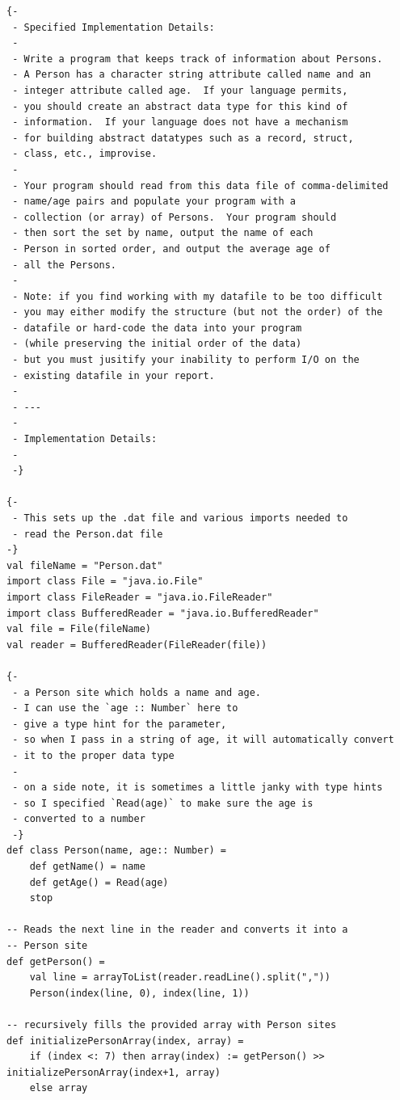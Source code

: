 \documentclass[12pt, letterpaper]{article}
\begin{document}
\begin{lstlisting}
{-
 - Specified Implementation Details:
 - 
 - Write a program that keeps track of information about Persons.
 - A Person has a character string attribute called name and an
 - integer attribute called age.  If your language permits,
 - you should create an abstract data type for this kind of
 - information.  If your language does not have a mechanism
 - for building abstract datatypes such as a record, struct, 
 - class, etc., improvise.
 -
 - Your program should read from this data file of comma-delimited
 - name/age pairs and populate your program with a
 - collection (or array) of Persons.  Your program should
 - then sort the set by name, output the name of each 
 - Person in sorted order, and output the average age of
 - all the Persons.
 -
 - Note: if you find working with my datafile to be too difficult
 - you may either modify the structure (but not the order) of the
 - datafile or hard-code the data into your program
 - (while preserving the initial order of the data)
 - but you must jusitify your inability to perform I/O on the
 - existing datafile in your report.
 -
 - ---
 -
 - Implementation Details:
 -
 -}

{-
 - This sets up the .dat file and various imports needed to
 - read the Person.dat file
-}
val fileName = "Person.dat"
import class File = "java.io.File"
import class FileReader = "java.io.FileReader"
import class BufferedReader = "java.io.BufferedReader"
val file = File(fileName)
val reader = BufferedReader(FileReader(file))

{-
 - a Person site which holds a name and age.
 - I can use the `age :: Number` here to
 - give a type hint for the parameter,
 - so when I pass in a string of age, it will automatically convert
 - it to the proper data type
 -
 - on a side note, it is sometimes a little janky with type hints
 - so I specified `Read(age)` to make sure the age is
 - converted to a number
 -}
def class Person(name, age:: Number) =
    def getName() = name
    def getAge() = Read(age)
    stop

-- Reads the next line in the reader and converts it into a
-- Person site 
def getPerson() =
    val line = arrayToList(reader.readLine().split(","))
    Person(index(line, 0), index(line, 1)) 

-- recursively fills the provided array with Person sites
def initializePersonArray(index, array) =
    if (index <: 7) then array(index) := getPerson() >> initializePersonArray(index+1, array)
    else array 


\end{lstlisting}
\end{document}
